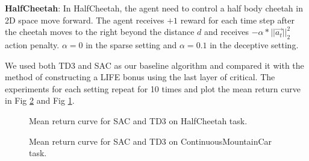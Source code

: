 \textbf{HalfCheetah}: In HalfCheetah, the agent need to control a half body cheetah in 2D space move forward. The agent receives $+1$ reward for each time step after the cheetah moves to the right beyond the distance $d$ and receives $-\alpha*||\vec{a_t}||^2_2$ action penalty.  $\alpha=0$ in the sparse setting and $\alpha=0.1$ in the deceptive setting.

We used both TD3 and SAC as our baseline algorithm and compared it with the method of constructing a LIFE bonus using the last layer of critical. The experiments for each setting repeat for 10 times and plot the mean return curve in Fig \ref{fig:GymCMC} and Fig \ref{fig:GymHC}.

\begin{figure}[hbt]
   \centering
   \caption{Mean return curve for SAC and TD3 on HalfCheetah task.}
   \label{fig:GymHC}
\end{figure}

\begin{figure}[hbt]
   \centering
   \caption{Mean return curve for SAC and TD3 on ContinuousMountainCar task.}
  \label{fig:GymCMC} 
\end{figure}

